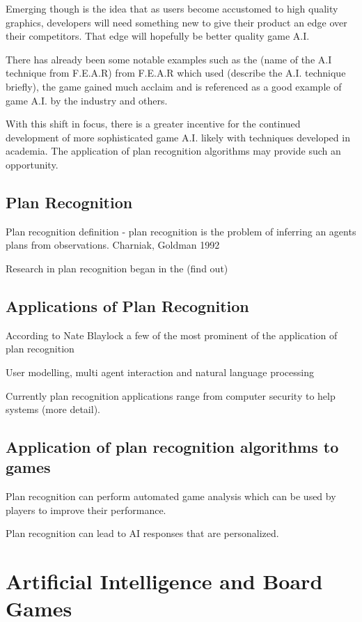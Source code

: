 \documentclass[parskip]{cs4rep}
\begin{document}
Emerging though is the idea that as users become accustomed to high quality graphics, developers will need something new to give their product an edge over their competitors. That edge will hopefully be better quality game A.I.

There has already been some notable examples such as the (name of the A.I technique from F.E.A.R) from F.E.A.R which used (describe the A.I. technique briefly), the game gained much acclaim and is referenced as a good example of game A.I. by the industry and others.

With this shift in focus, there is a greater incentive for the continued development of more sophisticated game A.I. likely with techniques developed in academia. The application of plan recognition algorithms may provide such an opportunity. 

\subsection{Plan Recognition}

Plan recognition definition - plan recognition is the problem of inferring an agents plans from observations. Charniak, Goldman 1992

Research in plan recognition began in the (find out)

\subsection{Applications of Plan Recognition}

According to Nate Blaylock a few of the most prominent of the application of plan recognition 

User modelling, multi agent interaction and natural language processing

Currently plan recognition applications range from computer security to help systems (more detail).

\subsection{Application of plan recognition algorithms to games}

Plan recognition can perform automated game analysis which can be used by players to improve their performance. 

Plan recognition can lead to AI responses that are personalized.

\section{Artificial Intelligence and Board Games}
\end{document}
